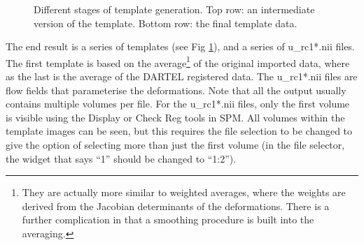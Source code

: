 \begin{figure}
\begin{center}
\end{center}
\caption{
Different stages of template generation.
Top row: an intermediate version of the template.
Bottom row: the final template data.
\label{Fig:sharpening}}
\end{figure}

The end result is a series of templates (see Fig \ref{Fig:sharpening}), and a series of u\_rc1*.nii files.
The first template is based on the average\footnote{They are actually more similar to weighted averages, where the weights are derived from the Jacobian determinants of the deformations. There is a further complication in that a smoothing procedure is built into the averaging.} of the original imported data, where as the last is the average of the DARTEL registered data.
The u\_rc1*.nii files are flow fields that parameterise the deformations.
Note that all the output usually contains multiple volumes per file.
For the u\_rc1*.nii files, only the first volume is visible using the Display or Check Reg tools in SPM.
All volumes within the template images can be seen, but this requires the file selection to be changed to give the option of selecting more than just the first volume (in the file selector, the widget that says ``1'' should be changed to ``1:2'').

